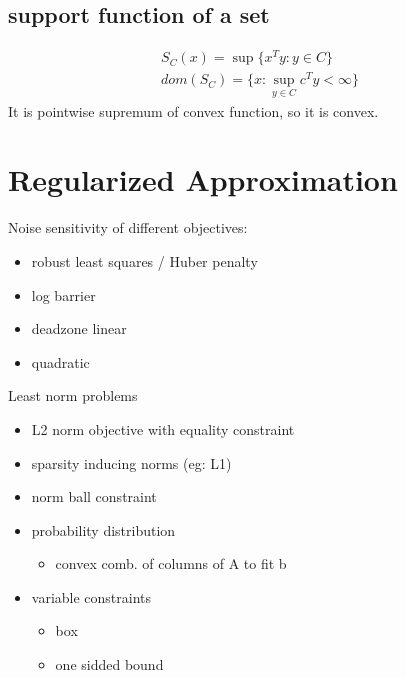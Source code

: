 \documentclass[8pt]{report}
\newcommand{\norm}[1]{\|#1\|}
\newcommand{\set}[1]{\{#1\}}
\begin{document}
\begin{multicols*}{2}
    
  
  \subsection{support function of a set}
  \begin{align*}
    S_C(x) = \sup \set{x^T y : y \in C}\\
    dom(S_C) = \set{x: \sup_{y\in C} c^Ty < \infty}
  \end{align*}
  It is pointwise supremum of convex function, so it is convex.
  
  \vfill\null
    
  \pagebreak

  \section{Regularized Approximation}

  Noise sensitivity of different objectives:
  \begin{itemize}
  \item robust least squares / Huber penalty
  \item log barrier
  \item deadzone linear
  \item quadratic
  \end{itemize}

  Least norm problems
  \begin{itemize}
  \item L2 norm objective with equality constraint
  \item sparsity inducing norms (eg: L1)
  \item norm ball constraint
  \item probability distribution
    \begin{itemize}
    \item convex comb. of columns of A to fit b
    \end{itemize}
  \item variable constraints
    \begin{itemize}
    \item box
    \item one sidded bound
    \end{itemize}
  \end{itemize}


\end{multicols*}
\end{document}
